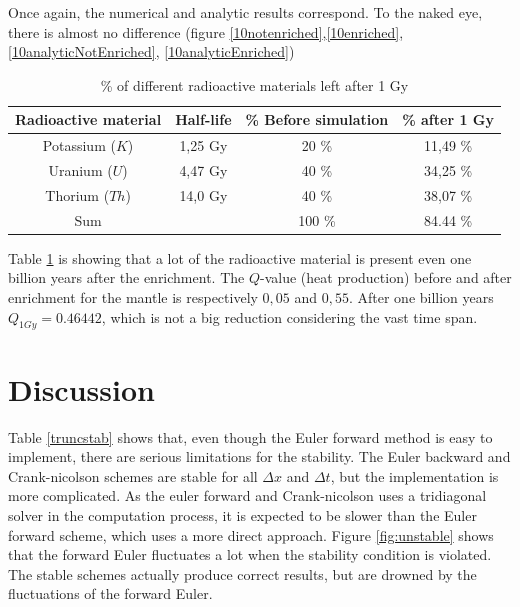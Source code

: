 \documentclass[10pt,a4paper]{article}
\begin{document}
\noindent Once again, the numerical and analytic results correspond. To the naked eye, there is almost no difference (figure \ref{10notenriched},\ref{10enriched}, \ref{10analyticNotEnriched}, \ref{10analyticEnriched}) 


\begin{table} [H]
\centering
\caption{\% of different radioactive materials left after 1 Gy}
\begin{tabular}{|c|c|c|c|}
\hline
Radioactive material & Half-life & \% Before simulation & \% after 1 Gy\\
\hline
Potassium ($K$) 	 & 1,25 Gy   & 20 \% 				 & 11,49 \% \\
\hline
Uranium ($U$)	     & 4,47 Gy   & 40 \%				 & 34,25 \% \\
\hline
Thorium ($Th$)		 & 14,0 Gy	 & 40 \%				 & 38,07 \% \\
\hline
Sum					 & 			 & 100 \% 				 & 84.44 \%\\
\hline
\end{tabular}
\label{Decay}
\end{table}

\noindent Table \ref{Decay} is showing that a lot of the radioactive material is present even one billion years after the enrichment. The $Q$-value (heat production) before and after enrichment for the mantle is respectively $0,05$ and $0,55$. After one billion years $Q_{1Gy}=0.46442$, which is not a big reduction considering the vast time span.   


\section*{Discussion}

Table \ref{truncstab} shows that, even though the Euler forward method is easy to implement, there are serious limitations for the stability. The Euler backward and Crank-nicolson schemes are stable for all $\Delta x$ and $\Delta t$, but the implementation is more complicated. As the euler forward and Crank-nicolson uses a tridiagonal solver in the computation process, it is expected to be slower than the Euler forward scheme, which uses a more direct approach. Figure \ref{fig:unstable} shows that the forward Euler fluctuates a lot when the stability condition is violated. The stable schemes actually produce correct results, but are drowned by the fluctuations of the forward Euler. 
\\
\end{document}

